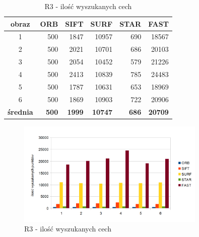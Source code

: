 \begin{table}[htbp]
  \centering
  \caption{R3 - ilość wyszukanych cech}
    \begin{tabular}{|c|r|r|r|r|r|}\hline
    
    obraz & \textbf{ORB} & \textbf{SIFT} & \textbf{SURF} & \textbf{STAR} & \textbf{FAST} \\\hline
    
    1 & 500 & 1847 & 10957 & 690 & 18567 \\
    2 & 500 & 2021 & 10701 & 686 & 20103 \\
    3 & 500 & 2054 & 10452 & 579 & 21226 \\
    4 & 500 & 2413 & 10839 & 785 & 24483 \\
    5 & 500 & 1787 & 10631 & 653 & 18969 \\
    6 & 500 & 1869 & 10903 & 722 & 20906 \\\hline
    \textbf{średnia} & \textbf{500} & \textbf{1999} & \textbf{10747} & \textbf{686} & \textbf{20709} \\
    \hline
    \end{tabular}%
  \label{tab:r3_f1}%
\end{table}%


\begin{figure}
\centering
\includegraphics[width=0.8\textwidth]{pict/slowik/r3/f1.png}
\caption{R3 - ilość wyszukanych cech}
\label{fig:r3_f1}
\end{figure}


